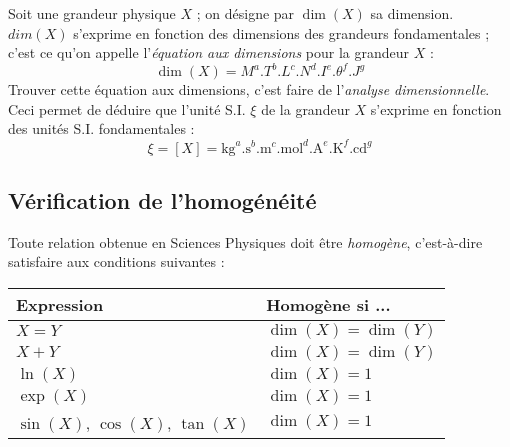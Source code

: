 \documentclass[MPSI]{tp}
\begin{document}
\indent Soit une grandeur physique $X$ ; on désigne par $\dim(X)$ sa dimension. $dim(X)$ s'exprime en fonction des dimensions des grandeurs fondamentales ; c'est ce qu'on appelle l'\emph{équation aux dimensions} pour la grandeur $X$ : 
\begin{equation*}
  \dim(X) = M^a.T^b.L^c.N^d.I^e.\theta^f.J^g
\end{equation*}
Trouver cette équation aux dimensions, c'est faire de l'\emph{analyse dimensionnelle}.\\
\indent Ceci permet de déduire que l'unité S.I. $\xi$ de la grandeur $X$ s'exprime en fonction des unités S.I. fondamentales : 
\begin{equation*}
  \xi = [X] = \text{kg}^a.\text{s}^b.\text{m}^c.\text{mol}^d.\text{A}^e.\text{K}^f.\text{cd}^g
\end{equation*}


\subsection{Vérification de l'homogénéité}

\indent Toute relation obtenue en Sciences Physiques doit être \emph{homogène}, c'est-à-dire satisfaire aux conditions suivantes :
\begin{center}
\begin{tabular}{@{}ll@{}}
\toprule
\textbf{Expression} & \textbf{Homogène si ...}\\
\midrule
$X=Y$ & $\dim(X)=\dim(Y)$\\
$X+Y$ & $\dim(X)=\dim(Y)$\\
$\ln(X)$ & $\dim(X)=1$\\
$\exp(X)$ & $\dim(X)=1$\\
$\sin(X)$, $\cos(X)$, $\tan(X)$ & $\dim(X)=1$\\
\bottomrule
\end{tabular}
\end{center}
\end{document}
